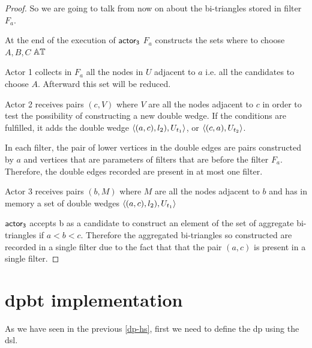\begin{proof}
\iffalse
Obvious from the definition of $I,J,K$  and the algorithm of obtaining bi-triangles. 

Lets assume that a bi-triangle $(a,A,b,B,c,C)$   will assume that $a$ is the smallest element in the set $\{a,b,c\}$ and $c$ is the bigger.
When actor 1 in fiter $F_a$1 ends reading all the edges, $\{A,B\} \subseteq W_a$. Also When actor 1 in fiter $F_c$1 ends reading all the edges, $\{B,C\} \subseteq W_c$. 

AS $a < c$  in filter $F_a$ the pair $(a,c)$  will be added to D
$DW$. When actor 3 in filter $F_a$ receives $(b, W_b)$ will add to $BT$ because of the non empty intersection. Therefore the bi-triangle $(a,A,b,B,c,C)$ can be recognized
\fi

So we are going to talk from now on about the bi-triangles stored in filter $F_a$.

At the end of the execution of $\mathsf{actor_3}$ $F_a$ constructs the sets where to choose $A,B,C$ $\mathbb{AT}$

Actor 1 collects in $F_a$ all the nodes in $U$ adjacent to $a$ i.e. all the candidates to choose $A$. Afterward this set will be reduced. 

Actor 2 receives pairs $(c,V)$ where $V$ are all the nodes adjacent to $c$ in order to test the possibility of constructing a new double wedge.  If the conditions are fulfilled, it adds the double wedge $\left\langle (a,c), l_2), U_{t_1} \right\rangle$,  or $\left\langle (c, a), U_{t_2} \right\rangle$. 

In each filter, the pair of lower vertices in the double edges are pairs constructed by $a$ and vertices that are parameters of filters that are before the filter $F_a$. Therefore, the double edges recorded are present in at most one filter.

Actor 3 receives pairs $(b,M) $ where $M$ are all the nodes adjacent to $b$ and has in memory a set of double wedges $\left\langle (a,c), l_2), U_{t_1} \right\rangle$

$\mathsf{actor_3}$ accepts b as a candidate to construct an element of the set of aggregate bi-triangles if $a < b < c$. Therefore the aggregated bi-triangles so constructed are recorded in a single filter due to the fact that that the pair $(a,c)$ is present in a single filter.
\end{proof}
        
 
\section{\acrshort{dpbt} implementation}
As we have seen in the previous \autoref{dp-hs}, first we need to define the \acrshort{dp} using the \acrshort{dsl}.

